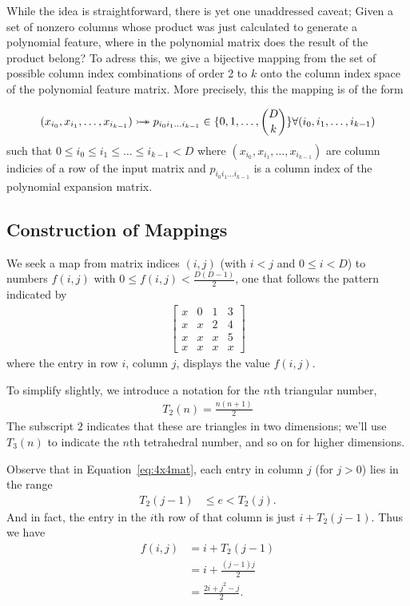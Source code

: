 \documentclass{article} %
\begin{document}
While the idea is straightforward, there is yet one unaddressed caveat; 
Given a set of nonzero columns whose product was just calculated to generate a polynomial feature, where in the polynomial matrix does the result of the product belong?
To adress this, we give a bijective mapping from the set of possible column index combinations of order 2 to $k$ onto the column index space of the polynomial feature matrix.
More precisely, this the mapping is of the form 

\begin{equation}
(x_{i_0}, x_{i_1}, \dots, x_{i_{k-1}}) \rightarrowtail \hspace{-1.9ex} \twoheadrightarrow p_{i_0i_1 \dots i_{k-1}} \in \{0,1,\dots, \binom{D}{k}\} 
\forall (i_0, i_1, \dots, i_{k-1})
\end{equation}
such that $ 0 \le i_0 \le i_1 \le \dots \le i_{k-1} < D$
where $(x_{i_0}, x_{i_1}, \dots, x_{i_{k-1}})$ are column indicies of a row of the input matrix and $p_{i_0i_1 \dots i_{k-1}}$ is a column index of the polynomial expansion matrix.

\subsection{Construction of Mappings}

We seek a map from matrix indices $(i, j)$ (with $i < j$ and $0 \le i < D$) to numbers $f(i, j)$ with $0 \le f(i, j) < \frac{D(D-1)}{2}$, one that follows the pattern indicated by 
\begin{align}
\begin{bmatrix}
x & 0 & 1 & 3 \\
x & x & 2 & 4 \\
x & x & x & 5 \\
x & x & x & x
\end{bmatrix}
\label{eq:4x4mat}
\end{align}
where the entry in row $i$, column $j$, displays the value $f(i, j)$. 

To simplify slightly, we introduce a notation for the $n$th triangular number, 
\begin{align}
T_2(n) = \frac{n(n+1)}{2}
\end{align}
\noindent
The subscript $2$ indicates that these are triangles in two dimensions; we'll use $T_3(n)$ to indicate the $n$th tetrahedral number, and so on for higher dimensions. 

Observe that in Equation~\ref{eq:4x4mat}, each entry in column $j$ (for $j > 0$) lies in the range
\begin{align}
T_2(j-1) &\le e < T_2(j).
\end{align}
\noindent
And in fact, the entry in the $i$th row of that column is just $i + T_2(j-1)$. Thus we have
\begin{align}
f(i, j) 
&= i + T_2(j-1)\\
&= i + \frac{(j-1)j}{2}\\
&=  \frac{2i + j^2-j}{2}.
\end{align}
\end{document}
